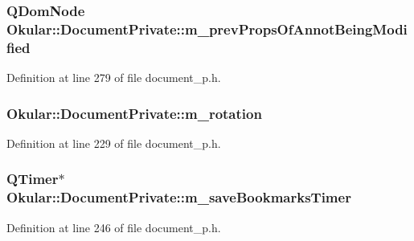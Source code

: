 \hypertarget{classOkular_1_1DocumentPrivate_a7f5fc408d6af006eaa4c2991ee263403}{
\subsubsection[{m\+\_\+prev\+Props\+Of\+Annot\+Being\+Modified}]{\setlength{\rightskip}{0pt plus 5cm}Q\+Dom\+Node Okular\+::\+Document\+Private\+::m\+\_\+prev\+Props\+Of\+Annot\+Being\+Modified}}\label{classOkular_1_1DocumentPrivate_a7f5fc408d6af006eaa4c2991ee263403}


Definition at line 279 of file document\+\_\+p.\+h.

\hypertarget{classOkular_1_1DocumentPrivate_a5b7f4c2b5937d311b277c2e90826ee1b}{
\subsubsection[{m\+\_\+rotation}]{ Okular\+::\+Document\+Private\+::m\+\_\+rotation}}\label{classOkular_1_1DocumentPrivate_a5b7f4c2b5937d311b277c2e90826ee1b}


Definition at line 229 of file document\+\_\+p.\+h.

\hypertarget{classOkular_1_1DocumentPrivate_a1d64b1924e24e32715cc5c7b3471595f}{
\subsubsection[{m\+\_\+save\+Bookmarks\+Timer}]{\setlength{\rightskip}{0pt plus 5cm}Q\+Timer$\ast$ Okular\+::\+Document\+Private\+::m\+\_\+save\+Bookmarks\+Timer}}\label{classOkular_1_1DocumentPrivate_a1d64b1924e24e32715cc5c7b3471595f}


Definition at line 246 of file document\+\_\+p.\+h.

